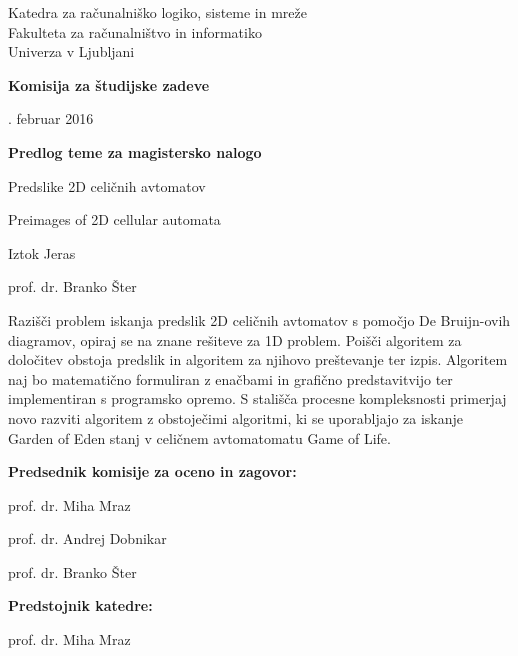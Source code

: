 \documentclass[a4paper, 12pt]{article}
\begin{document}
\noindent
Katedra za računalniško logiko, sisteme in mreže \\
Fakulteta za računalništvo in informatiko \\
Univerza v Ljubljani

\bigskip
{\bf Komisija za študijske zadeve}

. februar 2016

\bigskip
\begin{center}
{\Large\bf Predlog teme za magistersko nalogo}
\end{center}

\begin{description}[align=left,labelwidth=3cm,noitemsep,nolistsep]
\item [Naslov:]   Predslike 2D celičnih avtomatov
\item [Title:]    Preimages of 2D cellular automata
\\
\item [Kandidat:] Iztok Jeras
\\
\item [Mentor:]   prof. dr. Branko Šter
\\
\item [Tema naloge:] Razišči problem iskanja predslik 2D celičnih avtomatov
s pomočjo De Bruijn-ovih diagramov, opiraj se na znane rešiteve za 1D problem.
Poišči algoritem za določitev obstoja predslik in algoritem za njihovo preštevanje ter izpis.
Algoritem naj bo matematično formuliran z enačbami in grafično predstavitvijo
ter implementiran s programsko opremo.
S stališča procesne kompleksnosti primerjaj novo razviti algoritem z obstoječimi algoritmi,
ki se uporabljajo za iskanje Garden of Eden stanj v celičnem avtomatomatu Game of Life.
\end{description}

{\bf Predsednik komisije za oceno in zagovor:}
\begin{description}[align=left,labelwidth=3cm,noitemsep,nolistsep]
\item [Predsednik:] prof. dr. Miha Mraz

\item [Člani:]      prof. dr. Andrej Dobnikar
\item []            prof. dr. Branko Šter
\end{description}

\bigskip
{\bf Predstojnik katedre:}

\bigskip
prof. dr. Miha Mraz

\clearpage
\end{document}
